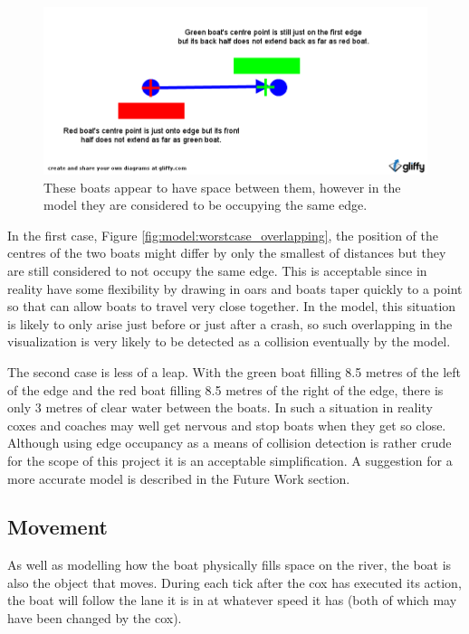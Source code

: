       \begin{figure}
      \begin{center}
      	\includegraphics[scale=0.3]{images/worstcase_no_overlap.png}
      	\caption{These boats appear to have space between them, however in the model they are considered to be occupying the same edge.}
      	\label{fig:model:worstcase_no_overlap}
      \end{center}
      \end{figure}
      
      In the first case, Figure \ref{fig:model:worstcase_overlapping}, the position of the centres of the two boats might differ by only the smallest of distances but they are still considered to not occupy the same edge. This is acceptable since in reality have some flexibility by drawing in oars and boats taper quickly to a point so  that can allow boats to travel very close together. In the model, this situation is likely to only arise just before or just after a crash, so such overlapping in the visualization is very likely to be detected as a collision eventually by the model.
      
      The second case is less of a leap. With the green boat filling 8.5 metres of the left of the edge and the red boat filling 8.5 metres of the right of the edge, there is only 3 metres of clear water between the boats. In such a situation in reality coxes and coaches may well get nervous and stop boats when they get so close. Although using edge occupancy as a means of collision detection is rather crude for the scope of this project it is an acceptable simplification. A suggestion for a more accurate model is described in the Future Work section.
      
      \subsection{Movement}
      As well as modelling how the boat physically fills space on the river, the boat is also the object that moves. During each tick after the cox has executed its action, the boat will follow the lane it is in at whatever speed it has (both of which may have been changed by the cox).
      
